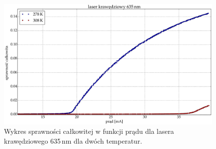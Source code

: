 \begin{figure}
\center
  \includegraphics[scale=0.25]{plot635/plot_wall_eff.eps}
  \caption{Wykres sprawności całkowitej w funkcji prądu dla lasera krawędziowego 635\,nm dla dwóch temperatur.}
  \label{fig:plot_eff_wall_635}
\end{figure}
\newpage
